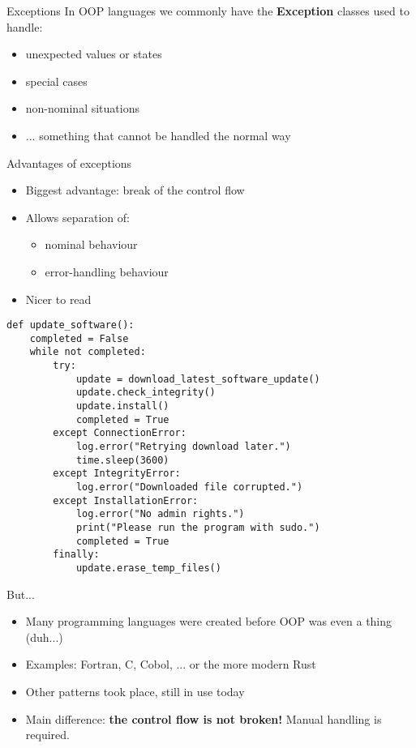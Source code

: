 \documentclass[aspectratio=169,14pt]{beamer}
\begin{document}
\begin{frame}{Exceptions}
In OOP languages we commonly have the \textbf{Exception} classes used to handle:
\begin{itemize}
    \item unexpected values or states
    \item special cases
    \item non-nominal situations
    \item ... something that cannot be handled the normal way
\end{itemize}
\end{frame}



\begin{frame}{Advantages of exceptions}
\begin{itemize}
    \item Biggest advantage: break of the control flow
    \item Allows separation of:\\
    \begin{itemize}
        \item nominal behaviour
        \item error-handling behaviour
    \end{itemize}
    \item Nicer to read
\end{itemize}
\end{frame}



\begin{frame}[fragile]{}
\begin{lstlisting}[style=pythonstyle]
def update_software():
    completed = False
    while not completed:
        try:
            update = download_latest_software_update()
            update.check_integrity()
            update.install()
            completed = True
        except ConnectionError:
            log.error("Retrying download later.")
            time.sleep(3600)
        except IntegrityError:
            log.error("Downloaded file corrupted.")
        except InstallationError:
            log.error("No admin rights.")
            print("Please run the program with sudo.")
            completed = True
        finally:
            update.erase_temp_files()
\end{lstlisting}
\end{frame}



\begin{frame}{But...}
\begin{itemize}
    \item Many programming languages were created before OOP was even a thing (duh...)
    \item Examples: Fortran, C, Cobol, ... or the more modern Rust
    \item Other patterns took place, still in use today
    \item Main difference: \textbf{the control flow is not broken!} Manual handling is required.
\end{itemize}
\end{frame}
\end{document}
